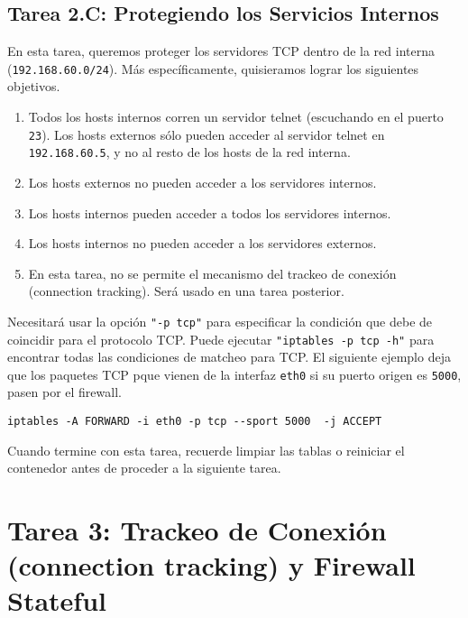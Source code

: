 \subsection{Tarea 2.C: Protegiendo los Servicios Internos}

En esta tarea, queremos proteger los servidores TCP dentro de la red interna  (\texttt{192.168.60.0/24}). 
Más específicamente, quisieramos lograr los siguientes objetivos.

\begin{enumerate}[noitemsep]
	
  \item Todos los hosts internos corren un servidor telnet (escuchando en el puerto \texttt{23}).
  Los hosts externos sólo pueden acceder al servidor telnet en \texttt{192.168.60.5}, y no al resto de los hosts de la red interna.
  
  \item Los hosts externos no pueden acceder a los servidores internos.

  \item Los hosts internos pueden acceder a todos los servidores internos.

  \item Los hosts internos no pueden acceder a los servidores externos.
  
  \item En esta tarea, no se permite el mecanismo del trackeo de conexión (connection tracking). Será usado en una tarea posterior.
\end{enumerate}

Necesitará usar la opción  \texttt{"-p tcp"} para especificar la condición que debe de coincidir para el protocolo TCP. Puede ejecutar \texttt{"iptables -p tcp -h"} para encontrar todas las condiciones de matcheo para TCP. El siguiente ejemplo deja  que los paquetes TCP pque vienen de la interfaz  \texttt{eth0} si su puerto origen es \texttt{5000}, pasen por el firewall.


\begin{lstlisting}
iptables -A FORWARD -i eth0 -p tcp --sport 5000  -j ACCEPT
\end{lstlisting}

Cuando termine con esta tarea, recuerde limpiar las tablas o reiniciar el contenedor antes de proceder a la siguiente tarea.




\section{Tarea 3: Trackeo de Conexión (connection tracking) y Firewall Stateful}

